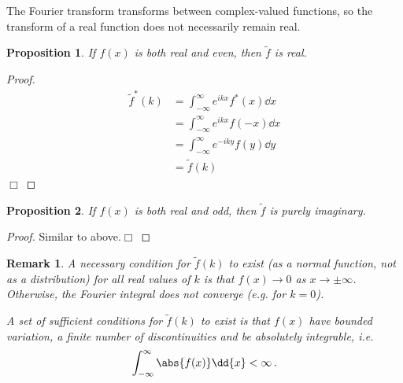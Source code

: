 \documentclass{article}
\theoremstyle{plain}\theoremheaderfont{\normalfont\itshape}\theorembodyfont{\rmfamily}\theoremseparator{.}\newtheorem*{rem}{Remark}\newtheorem*{ex}{Example}\newtheorem*{proof}{Proof}\newtheorem*{altp}{Alternative proof}
\theoremstyle{plain}\theoremheaderfont{\normalfont\bfseries}\theorembodyfont{\rmfamily}\theoremseparator{.}\newtheorem{thm}{Theorem}[section]\newtheorem{lem}[thm]{Lemma}\newtheorem{prop}[thm]{Proposition}\newtheorem*{cor}{Corollary}\newtheorem{defn}[thm]{Definition}\newtheorem{clm}[thm]{Claim}\newtheorem{clminproof}{Claim}
\theoremstyle{break}\theoremheaderfont{\normalfont\itshape}\theorembodyfont{\rmfamily}\theoremseparator{.\medskip}\newtheorem*{proofskip}{Proof}\newtheorem*{exs}{Examples}\newtheorem*{rems}{Remarks}
\theoremstyle{break}\theoremheaderfont{\normalfont\bfseries}\theorembodyfont{\rmfamily}\theoremseparator{.\medskip}\newtheorem{lemskip}[thm]{Lemma}\newtheorem{defnskip}[thm]{Definition}\newtheorem{propskip}[thm]{Proposition}\newtheorem{thmskip}[thm]{Theorem}
\numberwithin{equation}{section}
\newcommand{\qed}{\hfill\ensuremath{\Box}}
\begin{document}
	The Fourier transform transforms between complex-valued functions, so the transform of a real function does not necessarily remain real.
	\begin{prop}
		If \(f(x)\) is both real and even, then \(\tilde{f}\) is real.
	\end{prop}
	\begin{proof}
		\begin{align*}
			\tilde{f}^*(k)&=\int_{-\infty}^{\infty}e^{ikx}f^*(x)\dd{x}\\
			&=\int_{-\infty}^{\infty}e^{ikx}f(-x)\dd{x}\\
			&=\int_{-\infty}^{\infty}e^{-iky}f(y)\dd{y}\\
			&=\tilde{f}(k)
		\end{align*}\qed
	\end{proof}
	\begin{prop}
		If \(f(x)\) is both real and odd, then \(\tilde{f}\) is purely imaginary.
	\end{prop}
	\begin{proof}
		Similar to above.\qed
	\end{proof}
	\begin{rem}
		A necessary condition for \(\tilde{f}(k)\) to exist (as a normal function, not as a distribution) for all real values of \(k\) is that \(f(x)\to 0\) as \(x\to\pm\infty\). Otherwise, the Fourier integral does not converge (e.g. for \(k=0\)).
	
		A set of sufficient conditions for \(\tilde{f}(k)\) to exist is that \(f(x)\) have bounded variation, a finite number of discontinuities and be absolutely integrable, i.e.
		\[\int_{-\infty}^{\infty}\abs{f(x)}\dd{x}<\infty\,.\]
	\end{rem}
	
\end{document}
